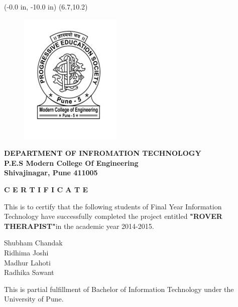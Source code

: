 \documentclass[12pt,a4paper]{article}
\begin{document}
\newpage
\pagestyle{empty}
	\thisfancyput(-0.0 in, -10.0 in) {\setlength{\unitlength}{1 in}\framebox(6.7,10.2)}
\begin{center}
\begin{figure}[h]
\centering
\includegraphics[width=2.5 cm]{modernlogo}
\end{figure}
\bf DEPARTMENT OF INFROMATION TECHNOLOGY \\\bf P.E.S Modern College Of Engineering \\
\textbf{Shivajinagar, Pune 411005}
\\
\end{center}
\vspace{0.2in}
\begin{center}
\textbf{\large{C E R T I F I C A T E}}\\
\vspace{0.2in}
\end{center}
		\noindent
  				\setlength{\baselineskip}{1.5\baselineskip}
	\begin{center}
\begin{flushleft}
This is to certify that the following students of Final Year Information Technology have successfully completed the project entitled \textbf{\small"ROVER THERAPIST"}in the academic year 2014-2015.
\end{flushleft} 
\begin{flushleft}
Shubham Chandak\\
Ridhima Joshi\\	
Madhur Lahoti\\
Radhika Sawant\\
\end{flushleft}
\begin{flushleft}
This is partial fulfillment of Bachelor of Information Technology under the University of Pune.
\end{flushleft}
	\end{center} 
		\vspace{0.6 in}
\end{document}
